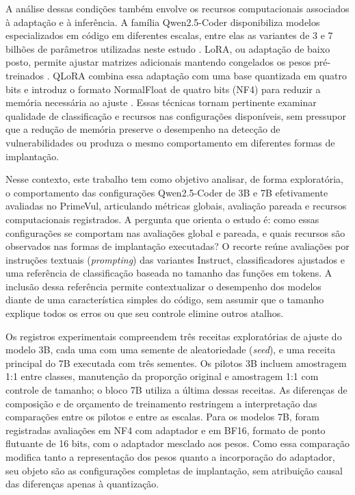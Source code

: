 \documentclass[12pt,a4paper]{article}
\begin{document}
A análise dessas condições também envolve os recursos computacionais associados à adaptação e à inferência. A família Qwen2.5-Coder disponibiliza modelos especializados em código em diferentes escalas, entre elas as variantes de 3 e 7 bilhões de parâmetros utilizadas neste estudo \cite{hui2024qwen}. LoRA, ou adaptação de baixo posto, permite ajustar matrizes adicionais mantendo congelados os pesos pré-treinados \cite{hu2021lora}. QLoRA combina essa adaptação com uma base quantizada em quatro bits e introduz o formato NormalFloat de quatro bits (NF4) para reduzir a memória necessária ao ajuste \cite{dettmers2023qlora}. Essas técnicas tornam pertinente examinar qualidade de classificação e recursos nas configurações disponíveis, sem pressupor que a redução de memória preserve o desempenho na detecção de vulnerabilidades ou produza o mesmo comportamento em diferentes formas de implantação.

Nesse contexto, este trabalho tem como objetivo analisar, de forma exploratória, o comportamento das configurações Qwen2.5-Coder de 3B e 7B efetivamente avaliadas no PrimeVul, articulando métricas globais, avaliação pareada e recursos computacionais registrados. A pergunta que orienta o estudo é: como essas configurações se comportam nas avaliações global e pareada, e quais recursos são observados nas formas de implantação executadas? O recorte reúne avaliações por instruções textuais (\textit{prompting}) das variantes Instruct, classificadores ajustados e uma referência de classificação baseada no tamanho das funções em tokens. A inclusão dessa referência permite contextualizar o desempenho dos modelos diante de uma característica simples do código, sem assumir que o tamanho explique todos os erros ou que seu controle elimine outros atalhos.

Os registros experimentais compreendem três receitas exploratórias de ajuste do modelo 3B, cada uma com uma semente de aleatoriedade (\textit{seed}), e uma receita principal do 7B executada com três sementes. Os pilotos 3B incluem amostragem 1:1 entre classes, manutenção da proporção original e amostragem 1:1 com controle de tamanho; o bloco 7B utiliza a última dessas receitas. As diferenças de composição e de orçamento de treinamento restringem a interpretação das comparações entre os pilotos e entre as escalas. Para os modelos 7B, foram registradas avaliações em NF4 com adaptador e em BF16, formato de ponto flutuante de 16 bits, com o adaptador mesclado aos pesos. Como essa comparação modifica tanto a representação dos pesos quanto a incorporação do adaptador, seu objeto são as configurações completas de implantação, sem atribuição causal das diferenças apenas à quantização.
\end{document}
